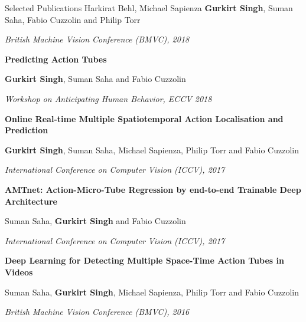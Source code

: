\documentclass{resume} %
\begin{document}
\begin{rSection}{Selected Publications}
\vspace{-0.08in}
\small{Harkirat Behl, Michael Sapienza \textbf{Gurkirt Singh}, Suman Saha, Fabio Cuzzolin and Philip Torr}

\vspace{-0.08in}
\textit{\small{British Machine Vision Conference (BMVC), 2018}}


\vspace{-0.03in}
\textbf{Predicting Action Tubes}

\vspace{-0.08in}
\small{\textbf{Gurkirt Singh}, Suman Saha and Fabio Cuzzolin}

\vspace{-0.08in}
\textit{\small{Workshop on Anticipating Human Behavior, ECCV 2018}}


\vspace{-0.03in}
\textbf{Online Real-time Multiple Spatiotemporal Action Localisation and Prediction}

\vspace{-0.08in}
\small{\textbf{Gurkirt Singh}, Suman Saha, Michael Sapienza, Philip Torr and Fabio Cuzzolin}

\vspace{-0.08in}
\textit{\small{International Conference on Computer Vision (ICCV), 2017}}


\vspace{-0.03in}
\textbf{AMTnet: Action-Micro-Tube Regression by end-to-end Trainable Deep Architecture}

\vspace{-0.08in}
\small{Suman Saha, \textbf{Gurkirt Singh} and Fabio Cuzzolin}

\vspace{-0.08in}
\textit{\small{International Conference on Computer Vision (ICCV), 2017}}


\vspace{-0.03in}
\textbf{Deep Learning for Detecting Multiple Space-Time Action Tubes in Videos}

\vspace{-0.08in}
\small{Suman Saha, \textbf{Gurkirt Singh}, Michael Sapienza, Philip Torr and Fabio Cuzzolin}

\vspace{-0.08in}
\textit{\small{British Machine Vision Conference (BMVC), 2016}}


\end{rSection}
\end{document}
